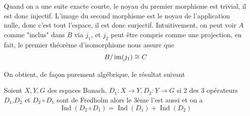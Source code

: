 \documentclass[memoire.tex]{subfiles}
\begin{document}
Quand on a une suite exacte courte, le noyau du premier morphisme est trivial, il est donc injectif. L'image du second morphisme est le noyau de l'application nulle, donc c'est tout l'espace, il est donc surjectif. Intuitivement, on peut voir $A$ comme "inclus" dans $B$ via $j_1$, et $j_2$ peut être compris comme une projection, en fait, le premier théorème d'isomorphisme nous assure que 
\begin{equation*}
    B/\operatorname{im}(j_1)\cong C
\end{equation*}


On obtient, de façon purement algébrique, le résultat suivant
\begin{lemme}\label{lemma-compo}
    Soient $X,Y,G$ des espaces Banach, $D_1:X\rightarrow Y, D_2: Y\rightarrow G$ si 2 des 3 opérateurs $D_1$,$D_2$ et $D_2\circ D_1$ sont de Fredholm alors le 3ème l'est aussi et on a 
    \begin{equation*}
        \operatorname{Ind}(D_2\circ D_1)= \operatorname{Ind}(D_1)+\operatorname{Ind}(D_2)
    \end{equation*}
\end{lemme}
\end{document}
